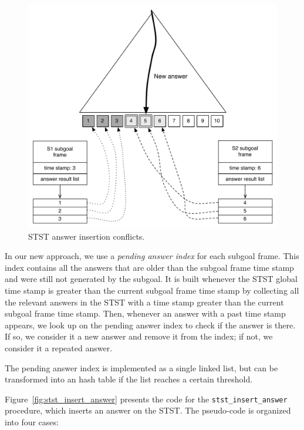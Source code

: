 \begin{figure}[ht]
  \centering
    \includegraphics[scale=0.5]{stst_conflicts.pdf}
  \caption{STST answer insertion conflicts.}
  \label{fig:stst_conflicts}
\end{figure}

In our new approach, we use a \textit{pending answer index} for each subgoal frame.
This index contains all the answers that are older than the subgoal frame time stamp
and were still not generated by the subgoal. It is built whenever the STST
global time stamp is greater than the current subgoal frame time stamp by
collecting all the relevant answers in the STST with a time stamp greater than
the current subgoal frame time stamp. Then, whenever an answer with a past time stamp appears,
we look up on the pending answer index to check if the answer is there. If so,
we consider it a new answer and remove it from the index; if not, we consider it a repeated answer.

The pending answer index is implemented as a single linked list, but can be transformed
into an hash table if the list reaches a certain threshold.

Figure~\ref{fig:stst_insert_answer} presents the code for the \texttt{stst\_insert\_answer} procedure,
which inserts an answer on the STST. The pseudo-code is organized into four cases:

